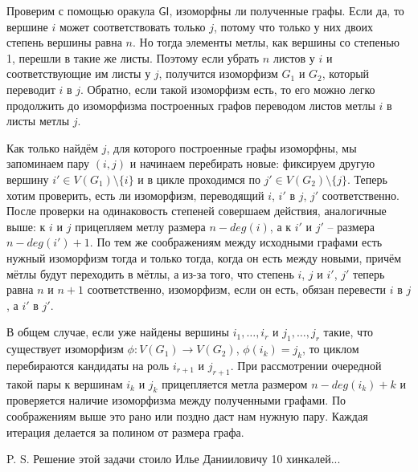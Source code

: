 Проверим с помощью оракула $\mathsf{GI}$, изоморфны ли полученные графы. Если да, то вершине $i$ может соответствовать только $j$, потому что только у них двоих степень вершины равна $n$. Но тогда элементы метлы, как вершины со степенью 1, перешли в такие же листы. Поэтому если убрать $n$ листов у $i$ и соответствующие им листы у $j$, получится изоморфизм $G_1$ и $G_2$, который переводит $i$ в $j$. Обратно, если такой изоморфизм есть, то его можно легко продолжить до изоморфизма построенных графов переводом листов метлы $i$ в листы метлы $j$.

Как только найдём $j$, для которого построенные графы изоморфны, мы запоминаем пару $(i, j)$ и начинаем перебирать новые: фиксируем другую вершину $i' \in V(G_1) \setminus \{i\}$ и в цикле проходимся по $j' \in V(G_2) \setminus \{j\}$. Теперь хотим проверить, есть ли изоморфизм, переводящий $i$, $i'$ в $j$, $j'$ соответственно. После проверки на одинаковость степеней совершаем действия, аналогичные выше: к $i$ и $j$ прицепляем метлу размера $n - deg(i)$, а к $i'$ и $j'$ -- размера $n - deg(i') + 1$. По тем же соображениям между исходными графами есть нужный изоморфизм тогда и только тогда, когда он есть между новыми, причём мётлы будут переходить в мётлы, а из-за того, что степень $i$, $j$ и $i'$, $j'$ теперь равна $n$ и $n+1$ соответственно, изоморфизм, если он есть, обязан перевести $i$ в $j$, а $i'$ в $j'$. 

В общем случае, если уже найдены вершины $i_1, \ldots, i_r$ и $j_1, \ldots, j_r$ такие, что существует изоморфизм $\phi\colon V(G_1) \to V(G_2)$, $\phi(i_k) = j_k$, то циклом перебираются кандидаты на роль $i_{r+1}$ и $j_{r+1}$. При рассмотрении очередной такой пары к вершинам $i_k$ и $j_k$ прицепляется метла размером $n - deg(i_k) + k$ и проверяется наличие изоморфизма между полученными графами. По соображениям выше это рано или поздно даст нам нужную пару. Каждая итерация делается за полином от размера графа.

P. S. Решение этой задачи стоило Илье Данииловичу 10 хинкалей...